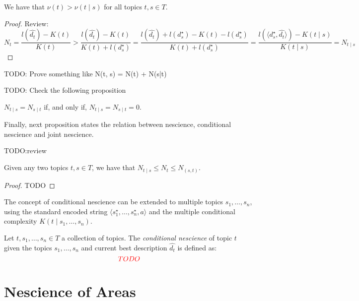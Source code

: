 \begin{proposition}
We have that $\nu(t) > \nu(t \mid s)$ for all topics $t, s \in T$.
\end{proposition}
\begin{proof}
{\color{red} Review:}
\[
N_t = \frac{l\left(\hat{d_t}\right) - K(t)}{K(t)} > \frac{l\left(\hat{d_t}\right) - K(t)}{K(t) + l\left(d_s^\star \right)} = \frac{l\left(\hat{d_t}\right) + l\left(d_s^\star \right) - K(t) - l\left(d_s^\star \right)}{K(t) + l\left(d_s^\star \right)} = \frac{l\left(\langle d_s^\star, \hat{d_t} \rangle \right)-K(t \mid s)}{K(t \mid s)} = N_{t \mid s}
\]
\end{proof}

{\color{red} TODO: Prove something like N(t, s) = N(t) + N(s|t)}

{\color{red} TODO: Check the following proposition}

\begin{proposition}
$N_{t \mid s} = N_{s \mid t}$ if, and only if, $N_{t \mid s} = N_{s \mid t} = 0$.
\end{proposition}

Finally, next proposition states the relation between nescience, conditional nescience and joint nescience.

{\color{red} TODO:review}

\begin{proposition}
Given any two topics $t, s \in T$, we have that $N_{t \mid s} \leq N_{t} \leq N_{(s, t)}$.
\end{proposition}
\begin{proof}
{\color{red} TODO}
\end{proof}

The concept of conditional nescience can be extended to multiple topics $s_1, \ldots, s_n$, using the standard encoded string $\langle s_1^\star, \ldots, s_n^\star, a \rangle$ and the multiple conditional complexity $K (t \mid s_1, \ldots, s_n)$.

\begin{definition}
Let $t, s_1, \ldots, s_n \in T$ a collection of topics. The \emph{conditional nescience} of topic $t$ given the topics $s_1, \ldots, s_n$ and current best description $\hat{d_t}$ is defined as: 
\[
{\color{red} TODO}
\]
\end{definition}

%
%

\section{Nescience of Areas}
\label{sec:nescience_areas}

